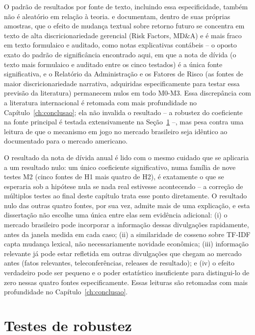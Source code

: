 \documentclass[a4paper,12pt]{report}
\begin{document}
O padrão de resultados por fonte de texto, incluindo essa especificidade, também não é aleatório em relação à teoria.  e  documentam, dentro de suas próprias amostras, que o efeito de mudança textual sobre retorno futuro se concentra em texto de alta discricionariedade gerencial (Risk Factors, MD\&A) e é mais fraco em texto formulaico e auditado, como notas explicativas contábeis -- o oposto exato do padrão de significância encontrado aqui, em que a nota de dívida (o texto mais formulaico e auditado entre os cinco testados) é a única fonte significativa, e o Relatório da Administração e os Fatores de Risco (as fontes de maior discricionariedade narrativa, adquiridas especificamente para testar essa previsão da literatura) permanecem nulos em todo M0-M3. Essa discrepância com a literatura internacional é retomada com mais profundidade no Capítulo~\ref{ch:conclusao}; ela não invalida o resultado -- a robustez do coeficiente na fonte principal é testada extensivamente na Seção~\ref{sec:robustez} --, mas pesa contra uma leitura de que o mecanismo em jogo no mercado brasileiro seja idêntico ao documentado para o mercado americano.

O resultado da nota de dívida anual é lido com o mesmo cuidado que se aplicaria a um resultado nulo: um único coeficiente significativo, numa família de nove testes M2 (cinco fontes de H1 mais quatro de H2), é exatamente o que se esperaria sob a hipótese nula se nada real estivesse acontecendo -- a correção de múltiplos testes ao final deste capítulo trata esse ponto diretamente. O resultado nulo das outras quatro fontes, por sua vez, admite mais de uma explicação, e esta dissertação não escolhe uma única entre elas sem evidência adicional: (i) o mercado brasileiro pode incorporar a informação dessas divulgações rapidamente, antes da janela medida em cada caso; (ii) a similaridade de cosseno sobre TF-IDF capta mudança lexical, não necessariamente novidade econômica; (iii) informação relevante já pode estar refletida em outras divulgações que chegam ao mercado antes (fatos relevantes, teleconferências, releases de resultado); e (iv) o efeito verdadeiro pode ser pequeno e o poder estatístico insuficiente para distingui-lo de zero nessas quatro fontes especificamente. Essas leituras são retomadas com mais profundidade no Capítulo~\ref{ch:conclusao}.

\section{Testes de robustez}
\label{sec:robustez}
\end{document}
